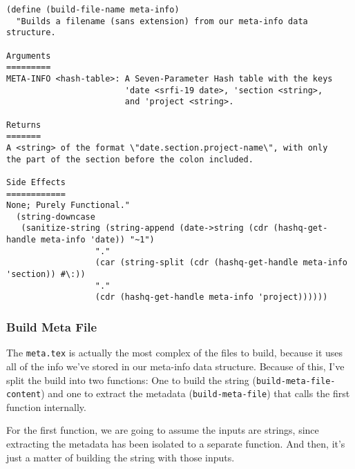 \documentclass[11pt]{article}
\begin{document}
\begin{verbatim}
(define (build-file-name meta-info)
  "Builds a filename (sans extension) from our meta-info data structure.

Arguments
=========
META-INFO <hash-table>: A Seven-Parameter Hash table with the keys 
                        'date <srfi-19 date>, 'section <string>, 
                        and 'project <string>.

Returns
=======
A <string> of the format \"date.section.project-name\", with only 
the part of the section before the colon included.

Side Effects
============
None; Purely Functional."
  (string-downcase
   (sanitize-string (string-append (date->string (cdr (hashq-get-handle meta-info 'date)) "~1")
                  "."
                  (car (string-split (cdr (hashq-get-handle meta-info 'section)) #\:))
                  "."
                  (cdr (hashq-get-handle meta-info 'project))))))
\end{verbatim}
\subsubsection{Build Meta File}
\label{sec:orgc0b9eef}
The \texttt{meta.tex} is actually the most complex of the files to build, because it
uses all of the info we've stored in our meta-info data structure. Because of
this, I've split the build into two functions: One to build the string
(\texttt{build-meta-file-content}) and one to extract the metadata (\texttt{build-meta-file})
that calls the first function internally.

For the first function, we are going to assume the inputs are strings, since
extracting the metadata has been isolated to a separate function. And then, it's
just a matter of building the string with those inputs.
\end{document}
